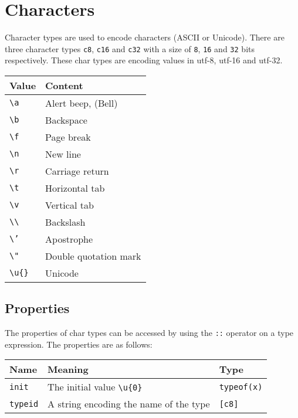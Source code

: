 \section{Characters}
\label{sec:char_type}

Character types are used to encode characters (ASCII or Unicode). There are
three character types \texttt{c8}, \texttt{c16} and \texttt{c32} with a size of
\texttt{8}, \texttt{16} and \texttt{32} bits respectively. These char types are
encoding values in utf-8, utf-16 and utf-32.

\begin{center}
  \vspace{-5pt}
  \begin{tabular}{ll}
    Value & Content\\[0pt]
    \hline
    \texttt{\textbackslash{}a} & Alert beep, (Bell)\\[0pt]
    \texttt{\textbackslash{}b} & Backspace\\[0pt]
    \texttt{\textbackslash{}f} & Page break\\[0pt]
    \texttt{\textbackslash{}n} & New line\\[0pt]
    \texttt{\textbackslash{}r} & Carriage return\\[0pt]
    \texttt{\textbackslash{}t} & Horizontal tab\\[0pt]
    \texttt{\textbackslash{}v} & Vertical tab\\[0pt]
    \texttt{\textbackslash{}\textbackslash{}} & Backslash\\[0pt]
    \texttt{\textbackslash{}'} & Apostrophe\\[0pt]
    \texttt{\textbackslash{}"} & Double quotation mark\\[0pt]
    \texttt{\textbackslash{}u\{\}} & Unicode\\[0pt]
  \end{tabular}
\end{center}

\subsection{Properties}
\label{sec:orgf9fbc31}

The properties of char types can be accessed by using the \texttt{::} operator
on a type expression. The properties are as follows:

\begin{center}
  \vspace{-5pt}
  \begin{adjustbox}{max width=\linewidth}
    \begin{tabular}{|l|ll|}
      \hline
      Name & Meaning & Type\\[0pt]
      \hline
      \hline
      \texttt{init} & The initial value \texttt{\textbackslash{}u\{0\}} & \texttt{typeof(x)}\\[0pt]
      \hline
      \texttt{typeid} & A string encoding the name of the type & \texttt{[c8]}\\[0pt]
      \hline
    \end{tabular}
  \end{adjustbox}
\end{center}


